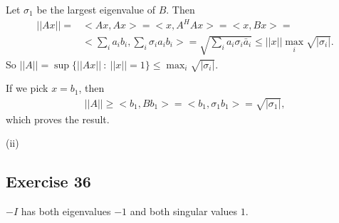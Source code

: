 \documentclass[11.5pt, letterpaper, bibtotoc,
    tablecaptionabove, figurecaptionabove]{article}
\begin{document}
Let $\sigma_1$ be the largest eigenvalue of $B$.
Then
\begin{align*}
    ||Ax|| =& <Ax,Ax> = <x,A^HAx> = 
    <x,Bx> =\\ &<\sum_ia_ib_i,\sum_i\sigma_ia_ib_i> =
    \sqrt{\sum_ia_i\sigma_i\bar{a}_i} \leq
    ||x||\max_i\sqrt{|\sigma_i|}.
\end{align*}
So $||A||=\sup\{||Ax||\ :\ ||x||=1\}\leq\max_i\sqrt{|\sigma_i|}$.

If we pick $x=b_1$, then
\begin{align*}
    ||A||\geq <b_1,Bb_1> = <b_1,\sigma_1b_1> = \sqrt{|\sigma_1|},
\end{align*}
which proves the result.

(ii)


\subsection*{Exercise 36}
$-I$ has both eigenvalues $-1$ and both singular values $1$.
 
\end{document}
